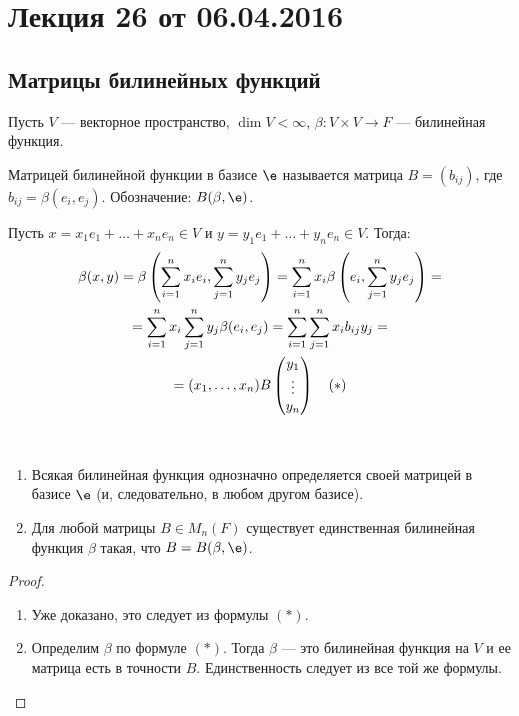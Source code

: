 


\section{Лекция 26 от 06.04.2016}

\subsection*{Матрицы билинейных функций}
Пусть $V$ --- векторное пространство, $\dim V < \infty$, $\beta \colon V \times V \rightarrow F$ --- билинейная функция.

\begin{Def}
Матрицей билинейной функции в базисе $\e$ называется матрица $B = (b_{ij})$, где $b_{ij} = \beta(e_i, e_j)$. Обозначение: $B(\beta, \e)$.
\end{Def}

Пусть $x = x_1e_1 + \ldots + x_ne_n \in V$ и $y = y_1e_1 + \ldots + y_ne_n \in V$. Тогда:
\begin{gather*}
\beta(x, y) = \beta\left(\sum_{i = 1}^{n}x_ie_i, \sum_{j = 1}^{n}y_je_j\right) = \sum_{i = 1}^{n} x_i\beta\left(e_i, \sum_{j = 1}^{n}y_je_j\right) = \\
= \sum_{i = 1}^{n}x_i\sum_{j = 1}^{n}y_j\beta(e_i, e_j) = \sum_{i = 1}^{n}\sum_{j = 1}^{n}x_ib_{ij}y_j = \\
= (x_1, \ldots, x_n)B \begin{pmatrix}{y}_1 \\\vdots\\{y}_n\end{pmatrix} \quad (*)
\end{gather*}

\begin{Suggestion}\
\begin{enumerate}
\item Всякая билинейная функция однозначно определяется своей матрицей в базисе $\e$ (и, следовательно, в любом другом базисе).
\item Для любой матрицы $B \in M_n(F)$ существует единственная билинейная функция $\beta$ такая, что $B = B(\beta, \e)$.
\end{enumerate}
\end{Suggestion}

\begin{proof}\
\begin{enumerate}
\item Уже доказано, это следует из формулы $(*)$.
\item Определим $\beta$ по формуле $(*)$. Тогда $\beta$ --- это билинейная функция на $V$ и ее матрица есть в точности $B$. Единственность следует из все той же формулы.
\end{enumerate}
\end{proof}

